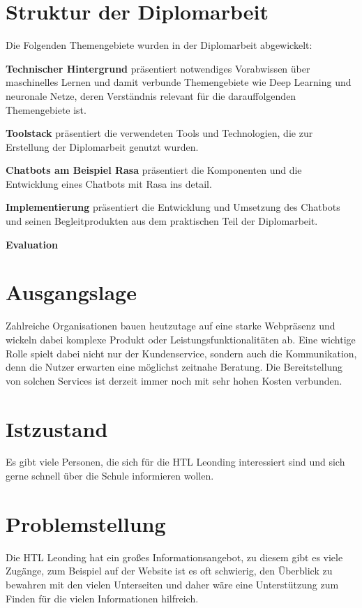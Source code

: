 \section{Struktur der Diplomarbeit}
Die Folgenden Themengebiete wurden in der Diplomarbeit abgewickelt:

\textbf{Technischer Hintergrund} präsentiert notwendiges Vorabwissen über maschinelles Lernen und damit verbunde Themengebiete wie Deep Learning und neuronale Netze, deren Verständnis relevant für die darauffolgenden Themengebiete ist.

\textbf{Toolstack} präsentiert die verwendeten Tools und Technologien, die zur Erstellung der Diplomarbeit genutzt wurden.

\textbf{Chatbots am Beispiel Rasa} präsentiert die Komponenten und die Entwicklung eines Chatbots mit Rasa ins detail.

\textbf{Implementierung} präsentiert die Entwicklung und Umsetzung des Chatbots und seinen Begleitprodukten aus dem praktischen Teil der Diplomarbeit.

\textbf{Evaluation}



\section{Ausgangslage}
Zahlreiche Organisationen bauen heutzutage auf eine starke Webpräsenz und wickeln dabei komplexe Produkt\- oder Leistungsfunktionalitäten ab.
Eine wichtige Rolle spielt dabei nicht nur der Kundenservice, sondern auch die Kommunikation, denn die Nutzer erwarten eine möglichst zeitnahe Beratung.
Die Bereitstellung von solchen Services ist derzeit immer noch mit sehr hohen Kosten verbunden.

\section{Istzustand}
Es gibt viele Personen, die sich für die HTL Leonding interessiert sind und sich gerne schnell über die Schule informieren wollen.


\section{Problemstellung}
Die HTL Leonding hat ein großes Informationsangebot, zu diesem gibt es viele Zugänge, zum Beispiel auf der Website ist es oft schwierig, den Überblick zu bewahren mit den vielen Unterseiten und daher wäre eine Unterstützung zum Finden für die vielen Informationen hilfreich.


